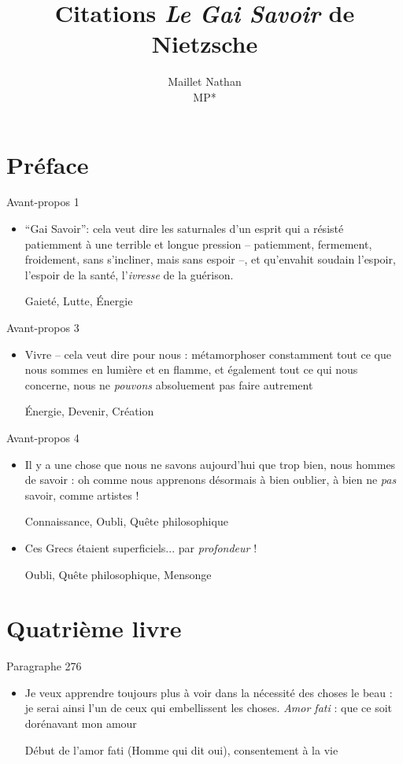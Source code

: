\documentclass[french,a4paper,11pt,answers]{exam}
\title{Citations \emph{Le Gai Savoir} de Nietzsche}
\author{Maillet Nathan\\MP*}
\date{}
\newcommand{\cit}[2]{\og #1 \fg{} \begin{solution}{ #2 }\end{solution}} %
\begin{document}
	\maketitle
	\section{Préface}
	\begin{cadre}{Avant-propos 1}
		\begin{itemize}
			\item \cit{“Gai Savoir'': cela veut dire les saturnales d'un esprit qui a résisté patiemment à une terrible et longue pression -- patiemment, fermement, froidement, sans s'incliner, mais sans espoir --, et qu'envahit soudain l'espoir, l'espoir de la santé, l'\emph{ivresse} de la guérison.}
				{Gaieté, Lutte, Énergie}
		\end{itemize}
	\end{cadre}
	
	\begin{cadre}{Avant-propos 3}
		\begin{itemize}
			\item \cit{Vivre -- cela veut dire pour nous : métamorphoser constamment tout ce que nous sommes en lumière et en flamme, et également tout ce qui nous concerne, nous ne \emph{pouvons} absoluement pas faire autrement}
				{Énergie, Devenir, Création}
		\end{itemize}
	\end{cadre}

	\begin{cadre}{Avant-propos 4}
		\begin{itemize}
			\item \cit{Il y a une chose que nous ne savons aujourd'hui que trop bien, nous hommes de savoir : oh comme nous apprenons désormais à bien oublier, à bien ne \emph{pas} savoir, comme artistes !}
				{Connaissance, Oubli, Quête philosophique}
			\item \cit{Ces Grecs étaient superficiels... par \emph{profondeur} !}
				{Oubli, Quête philosophique, Mensonge}
		\end{itemize}
	\end{cadre}

	\section{Quatrième livre}
	\begin{cadre}{Paragraphe 276}
		\begin{itemize}
			\item \cit{Je veux apprendre toujours plus à voir dans la nécessité des choses le beau : je serai ainsi l'un de ceux qui embellissent les choses. \emph{Amor fati} : que ce soit dorénavant mon amour}
				{Début de l'amor fati (Homme qui dit oui), consentement à la vie}
		\end{itemize}
	\end{cadre}
	
\end{document}
